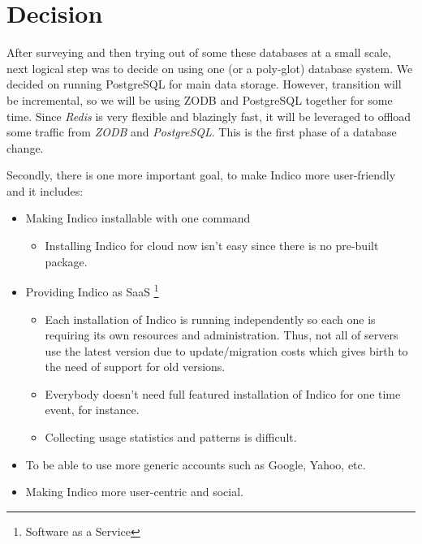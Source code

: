 \chapter{Decision}

After surveying and then trying out of some these databases at a small scale\cite{seven}, next logical step was to decide on using one (or a poly-glot) database system. We decided on running PostgreSQL for main data storage. However, transition will be incremental, so we will be using ZODB and PostgreSQL together for some time. Since \textit{Redis} is very flexible and blazingly fast, it will be leveraged to offload some traffic from \textit{ZODB} and \textit{PostgreSQL}. This is the first phase of a database change.

Secondly, there is one more important goal, to make Indico more user-friendly and it includes:
\begin{itemize}
  \item Making Indico installable with one command
  \begin{itemize}
    \item Installing Indico for cloud now isn't easy since there is no pre-built package.
  \end{itemize}
  \item Providing Indico as SaaS \footnote{Software as a Service}
  \begin{itemize}
    \item Each installation of Indico is running independently so each one is requiring its own resources and administration. Thus, not all of servers use the latest version due to update/migration costs which gives birth to the need of support for old versions.
    \item Everybody doesn't need full featured installation of Indico for one time event, for instance.
    \item Collecting usage statistics and patterns is difficult.
  \end{itemize}
  \item To be able to use more generic accounts such as Google, Yahoo, etc.
  \item Making Indico more user-centric and social.
\end{itemize}

